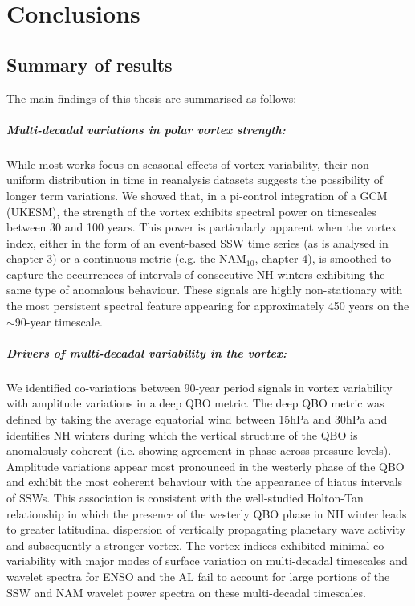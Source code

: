 \chapter{Conclusions}
\label{cha:conclusions}

\section{Summary of results}

The main findings of this thesis are summarised as follows: 

\paragraph{Multi-decadal variations in polar vortex strength:}
While most works focus on seasonal effects of vortex variability, their non-uniform distribution in time in reanalysis datasets suggests the possibility of longer term variations. We showed that, in a pi-control integration of a GCM (UKESM), the strength of the vortex exhibits spectral power on timescales between 30 and 100 years. This power is particularly apparent when the vortex index, either in the form of an event-based SSW time series (as is analysed in chapter 3) or a continuous metric (e.g. the NAM$_{10}$, chapter 4), is smoothed to capture the occurrences of intervals of consecutive NH winters exhibiting the same type of anomalous behaviour. These signals are highly non-stationary with the most persistent spectral feature appearing for approximately 450 years on the $\sim$90-year timescale. 

\paragraph{Drivers of multi-decadal variability in the vortex:}
We identified co-variations between 90-year period signals in vortex variability with amplitude variations in a deep QBO metric. The deep QBO metric was defined by taking the average equatorial wind between 15hPa and 30hPa and identifies NH winters during which the vertical structure of the QBO is anomalously coherent (i.e. showing agreement in phase across pressure levels). Amplitude variations appear most pronounced in the westerly phase of the QBO and exhibit the most coherent behaviour with the appearance of hiatus intervals of SSWs. This association is consistent with the well-studied Holton-Tan relationship in which the presence of the westerly QBO phase in NH winter leads to greater latitudinal dispersion of vertically propagating planetary wave activity and subsequently a stronger vortex. The vortex indices exhibited minimal co-variability with major modes of surface variation on multi-decadal timescales and wavelet spectra for ENSO and the AL fail to account for large portions of the SSW and NAM wavelet power spectra on these multi-decadal timescales.

